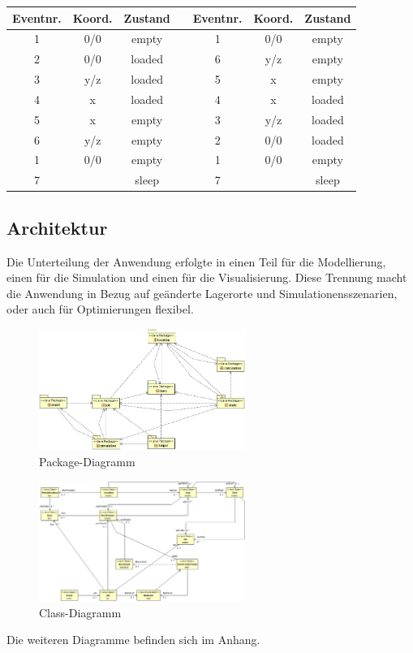 \begin{table}[H]
  \begin{center}   
    \begin{tabular}{ccc|c|ccc}
		Eventnr.&	Koord.&	Zustand & & Eventnr.&	Koord.&	Zustand\\
		\hline
		1 &			0/0 &	empty & & 1 &			0/0 	&empty\\
		2 &			0/0 &	loaded & & 6 &			y/z 	&empty\\
		3 &			y/z &	loaded & & 5 &			x 		&empty\\
		4 &			x 	&	loaded & & 4 &			x 		&loaded\\
		5 	&		x 	&	empty & & 3 &			y/z 	&loaded\\
		6 	&		y/z &	empty & & 2 &			0/0 	&loaded\\
		1	&		0/0	&	empty & & 1	&		0/0		&empty\\
		7 &					&sleep& & 7 &					&sleep\\
    \end{tabular}
  \end{center}
\end{table}
%	
\subsection{Architektur}
Die Unterteilung der Anwendung erfolgte in einen Teil für die Modellierung, einen für die Simulation und einen für die Visualisierung. Diese Trennung macht die Anwendung in Bezug auf geänderte Lagerorte und Simulationensszenarien, oder auch für Optimierungen flexibel.
%
%
\begin{figure}[H]
  \begin{center}
    \includegraphics[width=0.6\textwidth]{images/package_diagramm.png}
    \caption{Package-Diagramm}
    \label{fig:packages}
  \end{center}
\end{figure}
%
\begin{figure}[H]
  \begin{center}
    \includegraphics[width=0.6\textwidth]{images/class_diagramm.png}
    \caption{Class-Diagramm}
    \label{fig:class}
  \end{center}
\end{figure}
%
Die weiteren Diagramme befinden sich im Anhang.



